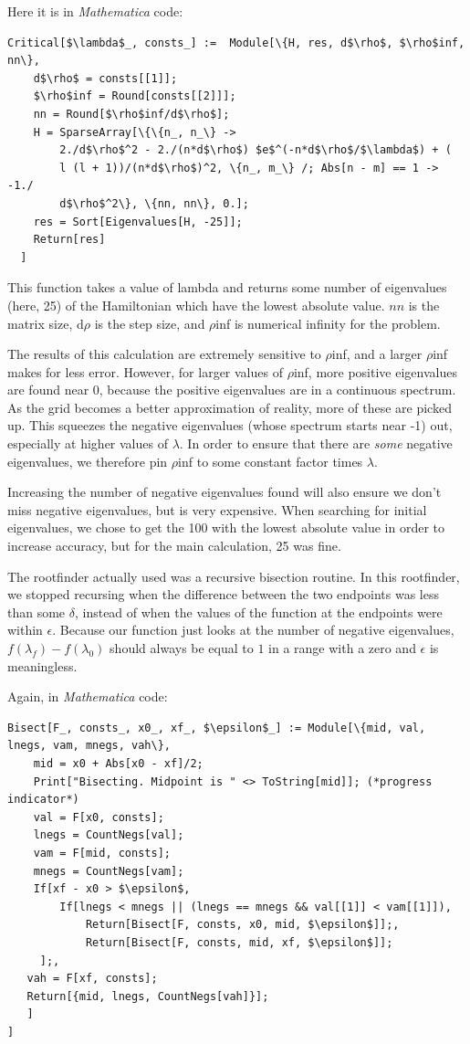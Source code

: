 \documentclass[12pt,twoside]{reedthesis}
\begin{document}
Here it is in \emph{Mathematica} code:
\begin{Verbatim}[commandchars=\\\{\}, codes={\catcode`$=3}]
Critical[$\lambda$_, consts_] :=  Module[\{H, res, d$\rho$, $\rho$inf, nn\},
    d$\rho$ = consts[[1]];
    $\rho$inf = Round[consts[[2]]];
    nn = Round[$\rho$inf/d$\rho$];
    H = SparseArray[\{\{n_, n_\} -> 
        2./d$\rho$^2 - 2./(n*d$\rho$) $e$^(-n*d$\rho$/$\lambda$) + (
        l (l + 1))/(n*d$\rho$)^2, \{n_, m_\} /; Abs[n - m] == 1 -> -1./
        d$\rho$^2\}, \{nn, nn\}, 0.];
    res = Sort[Eigenvalues[H, -25]];
    Return[res]
  ]
\end{Verbatim}
This function takes a value of lambda and returns some number of eigenvalues (here, 25)  of the Hamiltonian which have the lowest absolute value. $nn$ is the matrix size, d$\rho$ is the step size, and $\rho$inf is numerical infinity for the problem.

The results of this calculation are extremely sensitive to $\rho$inf, and a larger $\rho$inf makes for less error. However, for larger values of $\rho$inf, more positive eigenvalues are found near 0, because the positive eigenvalues are in a continuous spectrum. As the grid becomes a better approximation of reality, more of these are picked up. This squeezes the negative eigenvalues (whose spectrum starts near -1) out, especially at higher values of $\lambda$. In order to ensure that there are \emph{some} negative eigenvalues, we therefore pin $\rho$inf to some constant factor times $\lambda$. 

Increasing the number of negative eigenvalues found will also ensure we don't miss negative eigenvalues, but is very expensive. When searching for initial eigenvalues, we chose to get the 100 with the lowest absolute value in order to increase accuracy, but for the main calculation, 25 was fine.

The rootfinder actually used was a recursive bisection routine. In this rootfinder, we stopped recursing when the difference between the two endpoints was less than some $\delta$, instead of when the values of the function at the endpoints were within $\epsilon$. Because our function just looks at the number of negative eigenvalues, $f(\lambda_f) - f(\lambda_0)$ should always be equal to $1$ in a range with a zero and $\epsilon$ is meaningless. 

Again, in \emph{Mathematica} code:

\begin{Verbatim}[commandchars=\\\{\}, codes={\catcode`$=3}]
Bisect[F_, consts_, x0_, xf_, $\epsilon$_] := Module[\{mid, val, lnegs, vam, mnegs, vah\},
    mid = x0 + Abs[x0 - xf]/2;
    Print["Bisecting. Midpoint is " <> ToString[mid]]; (*progress indicator*)
    val = F[x0, consts];
    lnegs = CountNegs[val];
    vam = F[mid, consts];
    mnegs = CountNegs[vam];
    If[xf - x0 > $\epsilon$,
        If[lnegs < mnegs || (lnegs == mnegs && val[[1]] < vam[[1]]), 
            Return[Bisect[F, consts, x0, mid, $\epsilon$]];, 
            Return[Bisect[F, consts, mid, xf, $\epsilon$]]; 
     ];,
   vah = F[xf, consts];
   Return[{mid, lnegs, CountNegs[vah]}];
   ]
]
\end{Verbatim}
\end{document}
